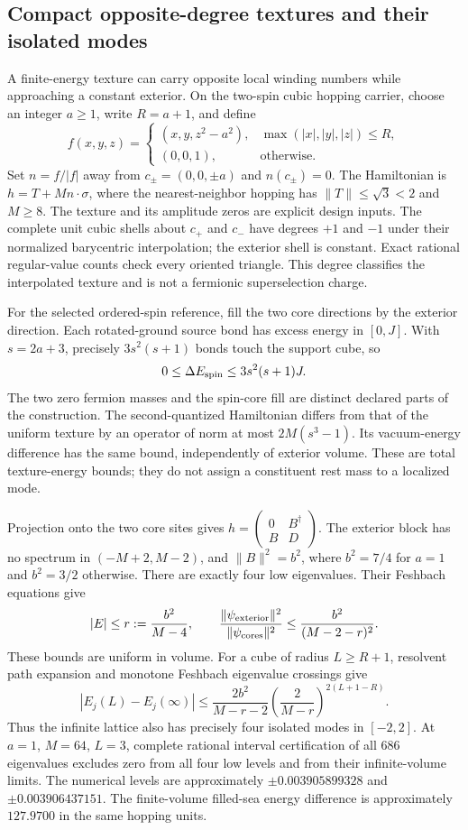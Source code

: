 \subsection{Compact opposite-degree textures and their isolated modes}
\label{subsec:compact-defect-pair}

A finite-energy texture can carry opposite local winding numbers while
approaching a constant exterior.  On the two-spin cubic hopping carrier,
choose an integer $a\geq1$, write $R=a+1$, and define
\[
 f(x,y,z)=
 \begin{cases}
 (x,y,z^2-a^2),&\max(|x|,|y|,|z|)\leq R,\\
 (0,0,1),&\text{otherwise}.
 \end{cases}
\]
Set $n=f/|f|$ away from $c_\pm=(0,0,\pm a)$ and $n(c_\pm)=0$.
The Hamiltonian is $h=T+M n\cdot\sigma$, where the nearest-neighbor
hopping has $\|T\|\leq\sqrt3<2$ and $M\geq8$.
The texture and its amplitude zeros are explicit design inputs.
The complete unit cubic shells about $c_+$ and $c_-$ have degrees $+1$
and $-1$ under their normalized barycentric interpolation; the exterior
shell is constant.  Exact rational regular-value counts check every
oriented triangle.  This degree classifies the interpolated texture and
is not a fermionic superselection charge.

For the selected ordered-spin reference, fill the two core directions
by the exterior direction.  Each rotated-ground source bond has excess
energy in $[0,J]$.  With $s=2a+3$, precisely $3s^2(s+1)$ bonds touch the
support cube, so
\[
 0\leq\Delta E_{\rm spin}\leq3s^2(s+1)J.
\]
The two zero fermion masses and the spin-core fill are distinct declared
parts of the construction.  The second-quantized Hamiltonian differs
from that of the uniform texture by an operator of norm at most
$2M(s^3-1)$.  Its vacuum-energy difference has the same bound,
independently of exterior volume.  These are total texture-energy bounds;
they do not assign a constituent rest mass to a localized mode.

Projection onto the two core sites gives
$h=\left(\begin{smallmatrix}0&B^\dagger\\B&D\end{smallmatrix}\right)$.
The exterior block has no spectrum in $(-M+2,M-2)$, and
$\|B\|^2=b^2$, where $b^2=7/4$ for $a=1$ and $b^2=3/2$ otherwise.
There are exactly four low eigenvalues.  Their Feshbach equations give
\[
 |E|\leq r:=\frac{b^2}{M-4},\qquad
 \frac{\|\psi_{\rm exterior}\|^2}{\|\psi_{\rm cores}\|^2}
 \leq\frac{b^2}{(M-2-r)^2}.
\]
These bounds are uniform in volume.  For a cube of radius $L\geq R+1$,
resolvent path expansion and monotone Feshbach eigenvalue crossings give
\[
 |E_j(L)-E_j(\infty)|\leq
 \frac{2b^2}{M-r-2}
 \left(\frac{2}{M-r}\right)^{2(L+1-R)}.
\]
Thus the infinite lattice also has precisely four isolated modes in
$[-2,2]$.  At $a=1$, $M=64$, $L=3$, complete rational interval
certification of all $686$ eigenvalues excludes zero from all four low
levels and from their infinite-volume limits.  The numerical levels are
approximately $\pm0.003905899328$ and $\pm0.003906437151$.
The finite-volume filled-sea energy difference is approximately
$127.9700$ in the same hopping units.

